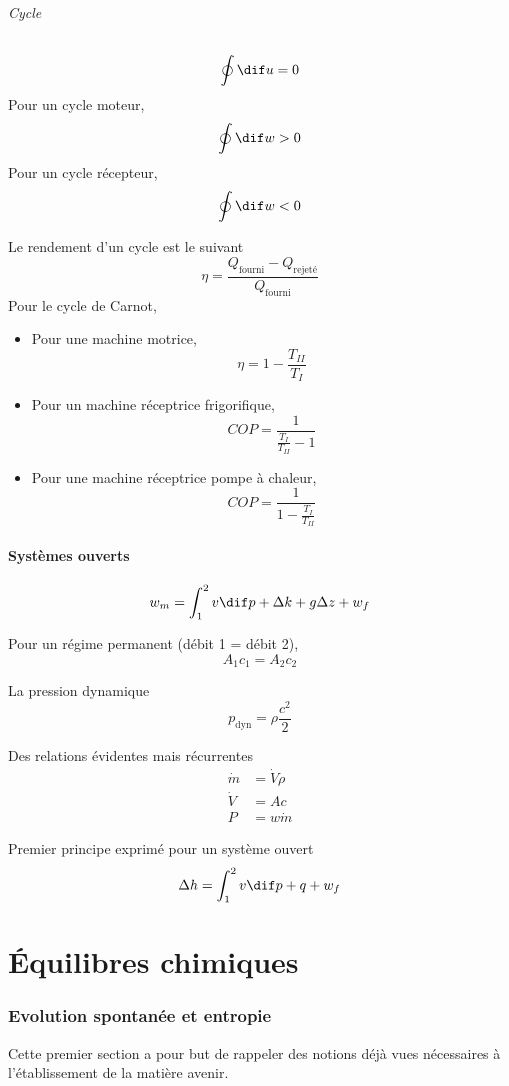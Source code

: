 \paragraph{Cycle}
\[ \oint \dif u = 0 \]
Pour un cycle moteur,
\[ \oint \dif w > 0 \]
Pour un cycle récepteur,
\[ \oint \dif w < 0 \]

Le rendement d'un cycle est le suivant
\[ \eta = \frac{Q_\mathrm{fourni} - Q_\mathrm{rejeté}}{Q_\mathrm{fourni}} \]
Pour le cycle de Carnot,
\begin{itemize}
  \item Pour une machine motrice,
    \[ \eta = 1 - \frac{T_{II}}{T_I} \]
  \item Pour un machine réceptrice frigorifique,
    \[ COP = \frac{1}{\frac{T_I}{T_{II}}-1} \]
  \item Pour une machine réceptrice pompe à chaleur,
    \[ COP = \frac{1}{1-\frac{T_I}{T_{II}}} \]
\end{itemize}

\subsection{Systèmes ouverts}
\[ w_m = \int_1^2v\dif p + \Delta k + g\Delta z + w_f \]

Pour un régime permanent (débit 1 = débit 2),
\[ A_1 c_1 = A_2 c_2 \]

La pression dynamique
\[ p_\mathrm{dyn} = \rho \frac{c^2}{2} \]

Des relations évidentes mais récurrentes
\begin{align*}
  \dot{m} & = \dot{V} \rho\\
  \dot{V} & = A c\\
  P & = w \dot{m}
\end{align*}

Premier principe exprimé pour un système ouvert
\[ \Delta h = \int_1^2 v \dif p + q + w_f \]

\part{Équilibres chimiques}
\section{Evolution spontanée et entropie}
Cette premier section a pour but de rappeler des notions déjà vues nécessaires
à l'établissement de la matière avenir.

